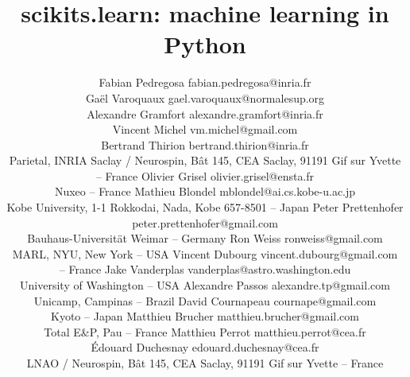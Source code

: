 \documentclass[twoside,11pt]{article}
\begin{document}
\title{scikits.learn: machine learning in Python}


\author{\name Fabian Pedregosa \email fabian.pedregosa@inria.fr \\
        \name Ga\"el Varoquaux \email gael.varoquaux@normalesup.org  \\
        \name Alexandre Gramfort \email alexandre.gramfort@inria.fr \\
        \name Vincent Michel  \email vm.michel@gmail.com \\
        \name Bertrand Thirion  \email bertrand.thirion@inria.fr \\
        \addr Parietal, INRIA Saclay / Neurospin, 
	    B\^at 145, CEA Saclay, 91191 Gif sur Yvette -- {\sc France}
        \AND
        \name Olivier Grisel \email olivier.grisel@ensta.fr \\
        \addr Nuxeo -- {\sc France} 
        \AND
        \name Mathieu Blondel \email mblondel@ai.cs.kobe-u.ac.jp \\
        \addr Kobe University, 1-1 Rokkodai, Nada, Kobe 657-8501 -- {\sc Japan} 
        \AND
        \name Peter Prettenhofer \email peter.prettenhofer@gmail.com \\
        \addr Bauhaus-Universit\"at Weimar -- {\sc Germany}
        \AND
        \name Ron Weiss \email ronweiss@gmail.com \\
        \addr MARL, NYU, New York -- {\sc USA}
        \AND
        \name Vincent Dubourg \email vincent.dubourg@gmail.com\\
        \addr  -- {\sc France}
        \AND
        \name Jake Vanderplas \email vanderplas@astro.washington.edu\\
        \addr University of Washington -- {\sc USA}
	\AND
        \name Alexandre Passos \email alexandre.tp@gmail.com \\
        \addr Unicamp,  Campinas -- {\sc Brazil}
        \AND
        \name David Cournapeau \email cournape@gmail.com \\
        \addr Kyoto -- {\sc Japan}
        \AND
        \name Matthieu Brucher \email matthieu.brucher@gmail.com \\
        \addr Total E\&P,  Pau -- {\sc France}
        \AND
        \name Matthieu Perrot \email matthieu.perrot@cea.fr\\
        \name \'Edouard Duchesnay \email edouard.duchesnay@cea.fr \\
        \addr LNAO / Neurospin, 
	    B\^at 145, CEA Saclay, 91191 Gif sur Yvette -- {\sc France}
}
\end{document}
